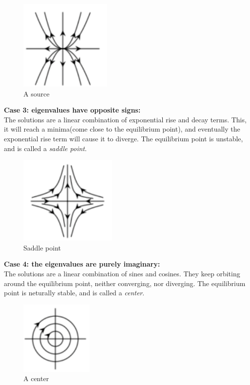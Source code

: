 \documentclass{article}
\begin{document}
\begin{figure}[h]
    \centering
    \includegraphics[scale = 0.9]{source.png}
    \caption{A source}
    \label{fig:my_label}
\end{figure}

\textbf{Case 3: eigenvalues have opposite signs: }\\
The solutions are a linear combination of exponential rise and decay terms. This, it will reach a minima(come close to the equilibrium point), and eventually the exponential rise term will cause it to diverge. The equilibrium point is unstable, and is called a \emph{saddle point}.
\begin{figure}[h]
    \centering
    \includegraphics[scale = 0.9]{saddle.png}
    \caption{Saddle point}
    \label{fig:my_label}
\end{figure}

\textbf{Case 4: the eigenvalues are purely imaginary: }\\
The solutions are a linear combination of sines and cosines. They keep orbiting around the equilibrium point, neither converging, nor diverging. The equilibrium point is neturally stable, and is called a \emph{center}.

\begin{figure}[h]
    \centering
    \includegraphics[scale = 1]{center.png}
    \caption{A center}
    \label{fig:my_label}
\end{figure}
\end{document}
